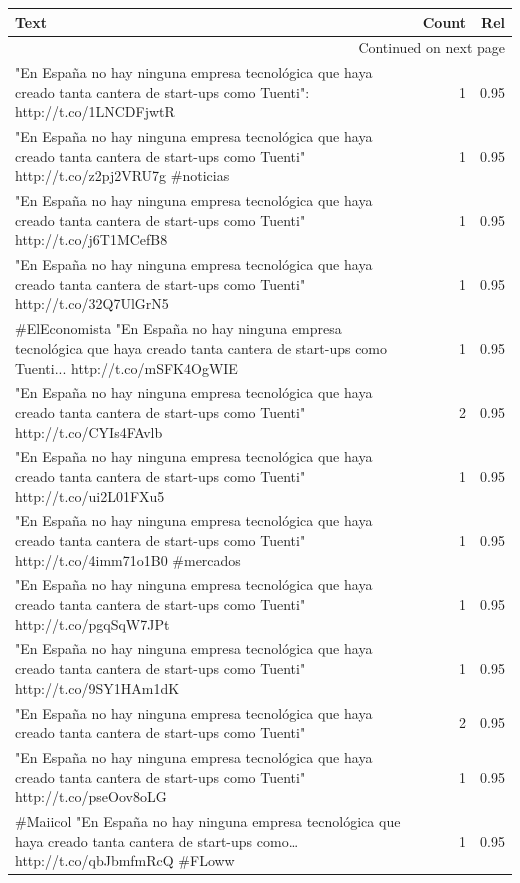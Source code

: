 \begin{longtable}{p{12.5cm}rr}
\toprule
Text & Count & Rel \\
\midrule
\endhead
\midrule
\multicolumn{3}{r}{{Continued on next page}} \\
\midrule
\endfoot

\bottomrule
\endlastfoot
"En España no hay ninguna empresa tecnológica que haya creado tanta cantera de start-ups como Tuenti": http://t.co/1LNCDFjwtR & 1 & 0.95 \\
"En España no hay ninguna empresa tecnológica que haya creado tanta cantera de start-ups como Tuenti" http://t.co/z2pj2VRU7g \#noticias & 1 & 0.95 \\
"En España no hay ninguna empresa tecnológica que haya creado tanta cantera de start-ups como Tuenti" http://t.co/j6T1MCefB8 & 1 & 0.95 \\
"En España no hay ninguna empresa tecnológica que haya creado tanta cantera de start-ups como Tuenti" http://t.co/32Q7UlGrN5 & 1 & 0.95 \\
\#ElEconomista "En España no hay ninguna empresa tecnológica que haya creado tanta cantera de start-ups como Tuenti... http://t.co/mSFK4OgWIE & 1 & 0.95 \\
"En España no hay ninguna empresa tecnológica que haya creado tanta cantera de start-ups como Tuenti" http://t.co/CYIs4FAvlb & 2 & 0.95 \\
"En España no hay ninguna empresa tecnológica que haya creado tanta cantera de start-ups como Tuenti" http://t.co/ui2L01FXu5 & 1 & 0.95 \\
"En España no hay ninguna empresa tecnológica que haya creado tanta cantera de start-ups como Tuenti" http://t.co/4imm71o1B0 \#mercados & 1 & 0.95 \\
"En España no hay ninguna empresa tecnológica que haya creado tanta cantera de start-ups como Tuenti" http://t.co/pgqSqW7JPt & 1 & 0.95 \\
"En España no hay ninguna empresa tecnológica que haya creado tanta cantera de start-ups como Tuenti" http://t.co/9SY1HAm1dK & 1 & 0.95 \\
"En España no hay ninguna empresa tecnológica que haya creado tanta cantera de start-ups como Tuenti" & 2 & 0.95 \\
"En España no hay ninguna empresa tecnológica que haya creado tanta cantera de start-ups como Tuenti" http://t.co/pseOov8oLG & 1 & 0.95 \\
\#Maiicol "En España no hay ninguna empresa tecnológica que haya creado tanta cantera de start-ups como… http://t.co/qbJbmfmRcQ \#FLoww & 1 & 0.95 \\

\end{longtable}

